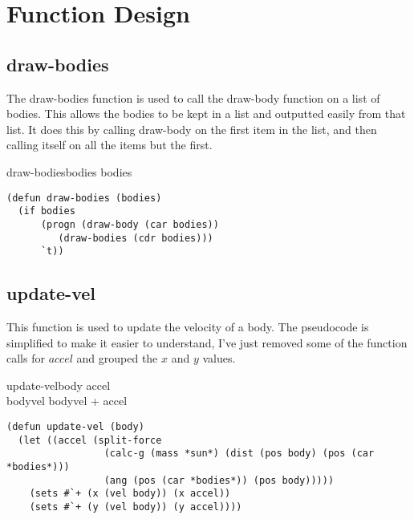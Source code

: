 
\section{Function Design}

\subsection{draw-bodies}
The draw-bodies function is used to call the draw-body function on a list of
bodies. This allows the bodies to be kept in a list and outputted easily from
that list. It does this by calling draw-body on the first item in the list, and
then calling itself on all the items but the first.

\begin{pseudocode}{draw-bodies}{bodies}
	\IF bodies
	  \THEN 
	    \BEGIN
	    	 \\
	    \END
	  \ELSE
      	    \RETURN{\TRUE}	
\end{pseudocode}

\begin{lstlisting}
(defun draw-bodies (bodies)
  (if bodies
      (progn (draw-body (car bodies))
	     (draw-bodies (cdr bodies)))
      `t)) 
\end{lstlisting}

\subsection{update-vel}
This function is used to update the velocity of a body. The pseudocode is
simplified to make it easier to understand, I've just removed some of the
function calls for $accel$ and grouped the $x$ and $y$ values. 

\begin{pseudocode}{update-vel}{body}
	\BEGIN
	accel \GETS {} \\
	bodyvel \GETS bodyvel + accel
	\END
\end{pseudocode}

\begin{lstlisting}
(defun update-vel (body)
  (let ((accel (split-force 
                 (calc-g (mass *sun*) (dist (pos body) (pos (car *bodies*)))
                 (ang (pos (car *bodies*)) (pos body)))))
    (sets #`+ (x (vel body)) (x accel))
    (sets #`+ (y (vel body)) (y accel))))
\end{lstlisting}

